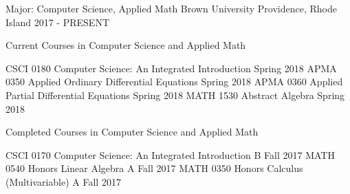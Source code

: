 \begin{cventries}
  \cventry
    {Major: Computer Science, Applied Math}
    {Brown University}
    {Providence, Rhode Island}
    {2017 - PRESENT}
    {
        Current Courses in Computer Science and Applied Math
        \vspace{-0.5em}
        \begin{cvhonors}
            \cvhonor
            {CSCI 0180}
            {Computer Science: An Integrated Introduction}
            {}
            {Spring 2018}
            \cvhonor
            {APMA 0350}
            {Applied Ordinary Differential Equations}
            {}
            {Spring 2018}
            \cvhonor
            {APMA 0360}
            {Applied Partial Differential Equations}
            {}
            {Spring 2018}
            \cvhonor
            {MATH 1530}
            {Abstract Algebra}
            {}
            {Spring 2018}
        \end{cvhonors}
        \vspace{0.5em}
        Completed Courses in Computer Science and Applied Math
        \vspace{-0.5em}
        \begin{cvhonors}
            \cvhonor
            {CSCI 0170}
            {Computer Science: An Integrated Introduction}
            {B}
            {Fall 2017}
            \cvhonor
            {MATH 0540}
            {Honors Linear Algebra}
            {A}
            {Fall 2017}
            \cvhonor
            {MATH 0350}
            {Honors Calculus (Multivariable)}
            {A}
            {Fall 2017}
        \end{cvhonors}
		\vspace{-1em}
    }
\end{cventries}


